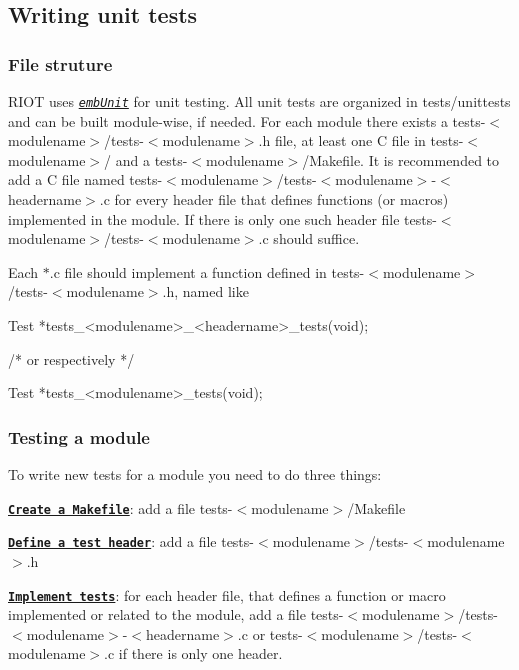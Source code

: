 \subsection*{Writing unit tests}

\subsubsection*{File struture}

R\+I\+OT uses \href{http://embunit.sourceforge.net/}{\tt {\itshape emb\+Unit}} for unit testing. All unit tests are organized in {\ttfamily tests/unittests} and can be built module-\/wise, if needed. For each module there exists a {\ttfamily tests-\/$<$modulename$>$/tests-\/$<$modulename$>$.h} file, at least one C file in {\ttfamily tests-\/$<$modulename$>$/} and a {\ttfamily tests-\/$<$modulename$>$/\+Makefile}. It is recommended to add a C file named {\ttfamily tests-\/$<$modulename$>$/tests-\/$<$modulename$>$-\/$<$headername$>$.c} for every header file that defines functions (or macros) implemented in the module. If there is only one such header file {\ttfamily tests-\/$<$modulename$>$/tests-\/$<$modulename$>$.c} should suffice.

Each {\ttfamily $\ast$.c} file should implement a function defined in {\ttfamily tests-\/$<$modulename$>$/tests-\/$<$modulename$>$.h}, named like


\begin{DoxyCode}
Test *tests\_<modulename>\_<headername>\_tests(\textcolor{keywordtype}{void});

\textcolor{comment}{/* or respectively */}

Test *tests\_<modulename>\_tests(\textcolor{keywordtype}{void});
\end{DoxyCode}


\subsubsection*{Testing a module}

To write new tests for a module you need to do three things\+:


\begin{DoxyEnumerate}
\item {\bfseries \href{#create-a-makefile}{\tt Create a Makefile}}\+: add a file {\ttfamily tests-\/$<$modulename$>$/\+Makefile}
\item {\bfseries \href{#define-a-test-header}{\tt Define a test header}}\+: add a file {\ttfamily tests-\/$<$modulename$>$/tests-\/$<$modulename$>$.h}
\item {\bfseries \href{#implement-tests}{\tt Implement tests}}\+: for each header file, that defines a function or macro implemented or related to the module, add a file {\ttfamily tests-\/$<$modulename$>$/tests-\/$<$modulename$>$-\/$<$headername$>$.c} or {\ttfamily tests-\/$<$modulename$>$/tests-\/$<$modulename$>$.c} if there is only one header.
\end{DoxyEnumerate}

